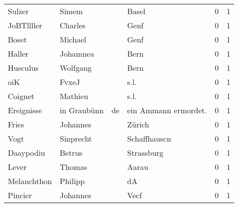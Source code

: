 \begin{center}
\begin{tiny}
\begin{longtabu}{llllrr}
                   Sulzer &                              Simem &             &                                       Basel &          0 &         1 \\
               JoBTllller &                            Charles &             &                                        Genf &          0 &         1 \\
                    Boset &                            Michael &             &                                        Genf &          0 &         1 \\
                   Haller &                           Johamnea &             &                                        Bern &          0 &         1 \\
                 Husculus &                           Wolfgang &             &                                        Bern &          0 &         1 \\
                      oiK &                              FvxeJ &             &                                        s.l. &          0 &         1 \\
                  Coignet &                            Mathieu &             &                                        s.l. &          0 &         1 \\
               Ereignisse &                        in Graubünn &          de &                       ein Ammann ermordet.  &          0 &         1 \\
                    Fries &                           Johannes &             &                                      Zürich &          0 &         1 \\
                     Vogt &                          Sinprecht &             &                                Schaffhauscn &          0 &         1 \\
                Daaypodiu &                             Betrus &             &                                  Strassburg &          0 &         1 \\
                    Lever &                             Thomas &             &                                       Aarau &          0 &         1 \\
              Melanchthon &                            Philipp &             &                                          dA &          0 &         1 \\
                  Pincier &                           Johannes &             &                                        Vecf &          0 &         1 \\

\end{longtabu}
\end{tiny}
\end{center}
